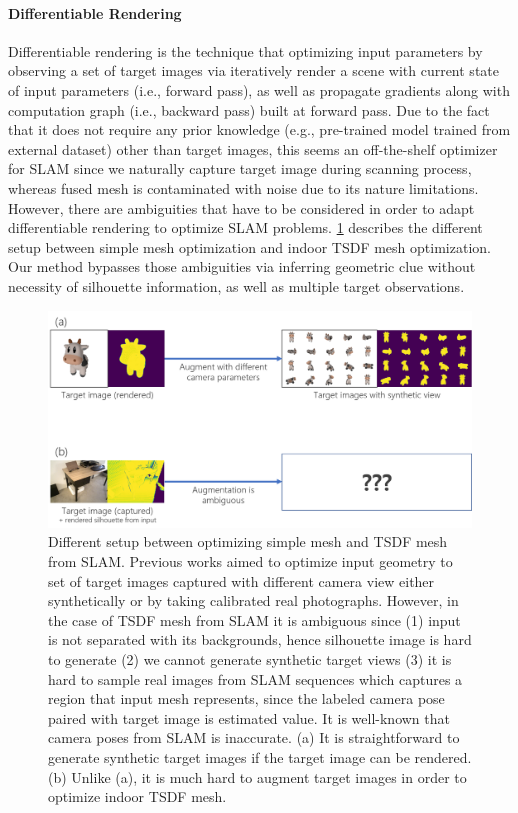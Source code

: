 \paragraph{Differentiable Rendering}
Differentiable rendering is the technique that 
optimizing input parameters by observing a set of target images 
via iteratively render a scene with current state of input parameters (i.e., forward pass), 
as well as propagate gradients along with computation graph (i.e., backward pass) built at forward pass. 
Due to the fact that it does not require any prior knowledge (e.g., pre-trained model trained from external dataset) 
other than target images, this seems an off-the-shelf optimizer for SLAM 
since we naturally capture target image during scanning process, 
whereas fused mesh is contaminated with noise due to its nature limitations. 
However, there are ambiguities that have to be considered 
in order to adapt differentiable rendering to optimize SLAM problems. 
\ref{fig:difference_simple_mesh_and_tsdf_mesh} describes the different setup between simple mesh optimization 
and indoor TSDF mesh optimization. 
Our method bypasses those ambiguities via inferring geometric clue 
without necessity of silhouette information, as well as multiple target observations.
\begin{figure}
    \includegraphics[width=\columnwidth]{figures/2_prev_difference_simple_mesh_and_tsdf_mesh.png}
    \caption{Different setup between optimizing simple mesh and TSDF mesh from SLAM. Previous works aimed to optimize input geometry to set of target images captured with different camera view either synthetically\cite{ravi2020accelerating}\cite{jatavallabhula2019kaolin}\cite{laine2020modular}\cite{nimier2019mitsuba} or by taking calibrated real photographs\cite{nimier2019mitsuba}. However, in the case of TSDF mesh from SLAM it is ambiguous since (1) input is not separated with its backgrounds, hence silhouette image is hard to generate (2) we cannot generate synthetic target views (3) it is hard to sample real images from SLAM sequences which captures a region that input mesh represents, since the labeled camera pose paired with target image is estimated value. It is well-known that camera poses from SLAM is inaccurate. (a) It is straightforward to generate synthetic target images if the target image can be rendered. (b) Unlike (a), it is much hard to augment target images in order to optimize indoor TSDF mesh.}
    \label{fig:difference_simple_mesh_and_tsdf_mesh}
\end{figure}